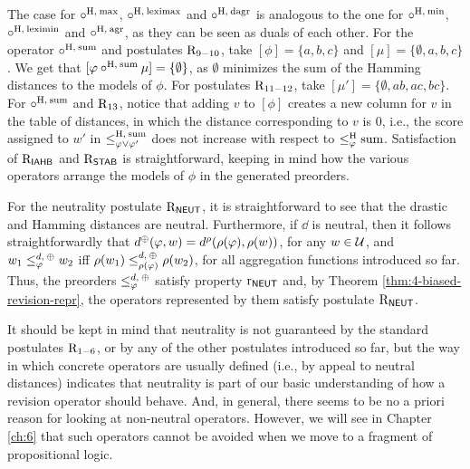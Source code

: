 \begin{prf*}{}{}
	The case for $\circ^{{\operatorname{H}},\:{\operatorname{max}}}$, $\circ^{{\operatorname{H}},\:{\operatorname{leximax}}}$
	and $\circ^{{\operatorname{H}},\:\mathrm{dagr}}$ is analogous to the one for 
	$\circ^{{\operatorname{H}},\:{\operatorname{min}}}$, $\circ^{{\operatorname{H}},\:{\operatorname{leximin}}}$
	and $\circ^{{\operatorname{H}},\:\mathrm{agr}}$, as they can be seen as duals of each other.
	For the operator $\circ^{{\operatorname{H}},\:{\operatorname{sum}}}$ and postulates $\mathrm{R}_{9-10}$, 
	take $[\phi]=\{a,b,c\}$ and $[\mu]=\{\emptyset,a,b,c\}$. 
	We get that $[\varphi\circ^{{\operatorname{H}},\:{\operatorname{sum}}}\mu]=\{\emptyset\}$,
	as $\emptyset$ minimizes the sum of the Hamming distances to the models 
	of $\phi$.
	For postulates $\mathrm{R}_{11-12}$, take $[\mu']=\{\emptyset,ab,ac,bc\}$.
	For $\circ^{{\operatorname{H}},\:{\operatorname{sum}}}$ and $\mathrm{R}_{13}$,
	notice that adding $v$ to $[\phi]$ creates a new column for $v$
	in the table of distances, in which the distance corresponding to $v$
	is $0$, i.e., the score assigned to $w'$ in $\le_{\varphi\lor\varphi'}^{{\operatorname{H}},\:{\operatorname{sum}}}$ 
	does not increase with respect to $\le_\varphi^{\operatorname{H}}{{\operatorname{sum}}}$. 
	Satisfaction of $\mathrm{R}_{\mathsf{IAHB}}$ and $\mathrm{R}_{\mathsf{STAB}}$ is straightforward, keeping in mind
	how the various operators arrange the models of $\phi$ in the generated preorders.

	For the neutrality postulate $\mathrm{R}_{\mathsf{NEUT}}$,
	it is straightforward to see that the drastic and Hamming distances
	are neutral.
	Furthermore, if $\dd$ is neutral,
	then it follows straightforwardly that 
	$d^{{\operatorname{\oplus}}}(\varphi,w)=d^{\rho}(\rho(\varphi),\rho(w))$,
	for any $w\in\mathcal{U}$,
	and 
	$w_1\le_\varphi^{d,\:{\operatorname{\oplus}}}w_2$ iff $\rho(w_1)\le^{d,\:{\operatorname{\oplus}}}_{\rho(\varphi)}\rho(w_2)$,
	for all aggregation functions introduced so far.
	Thus, the preorders $\le_\varphi^{d,\:{\operatorname{\oplus}}}$ satisfy property $\mathrm{r}_{\mathsf{NEUT}}$
	and, by Theorem \ref{thm:4-biased-revision-repr},
	the operators represented by them satisfy postulate $\mathrm{R}_{\mathsf{NEUT}}$.
\end{prf*}

It should be kept in mind that neutrality is not
guaranteed by the standard postulates $\mathrm{R}_{1-6}$,
or by any of the other postulates introduced so far,
but the way in which concrete operators are usually defined
(i.e., by appeal to neutral distances) indicates that neutrality is
part of our basic understanding of how a revision operator
should behave.
And, in general, there seems to be no a priori reason for
looking at non-neutral operators.
However, we will see in Chapter \ref{ch:6} 
that such operators cannot be avoided
when we move to a fragment of propositional logic.


